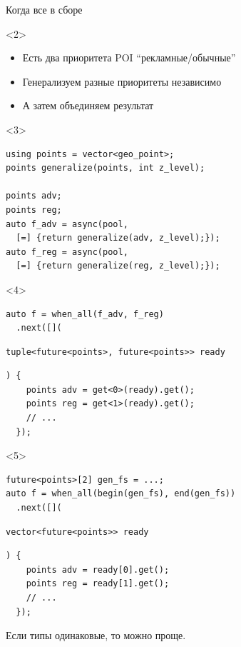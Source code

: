 \documentclass[aspectratio=169,hyperref={unicode},17pt]{beamer}
\begin{document}
\begin{frame}[fragile,t]{Когда все в сборе}
\begin{onlyenv}<2>
\begin{itemize}
 \item Есть два приоритета POI ``рекламные/обычные''
 \item Генерализуем разные приоритеты независимо
 \item А затем объединяем результат
\end{itemize}
\end{onlyenv}
\begin{onlyenv}<3>
\begin{lstlisting}[style=cppcode]
using points = vector<geo_point>;
points generalize(points, int z_level);

points adv;
points reg;
auto f_adv = async(pool,
  [=] {return generalize(adv, z_level);});
auto f_reg = async(pool,
  [=] {return generalize(reg, z_level);});
\end{lstlisting}
\end{onlyenv}
\begin{onlyenv}<4>
\begin{lstlisting}[style=cppcode,aboveskip=0pt,belowskip=0pt]
auto f = when_all(f_adv, f_reg)
  .next([](
\end{lstlisting}
\begin{lstlisting}[style=cppcode,backgroundcolor=\color{gray!30},aboveskip=0pt,belowskip=0pt]
    tuple<future<points>, future<points>> ready
\end{lstlisting}
\begin{lstlisting}[style=cppcode,aboveskip=0pt,belowskip=0pt]
  ) {
    points adv = get<0>(ready).get();
    points reg = get<1>(ready).get();
    // ...
  });
\end{lstlisting}
\end{onlyenv}
\begin{onlyenv}<5>
\begin{lstlisting}[style=cppcode,aboveskip=0pt,belowskip=0pt]
future<points>[2] gen_fs = ...;
auto f = when_all(begin(gen_fs), end(gen_fs))
  .next([](
\end{lstlisting}
\begin{lstlisting}[style=cppcode,backgroundcolor=\color{gray!30},aboveskip=0pt,belowskip=0pt]
    vector<future<points>> ready
\end{lstlisting}
\begin{lstlisting}[style=cppcode,aboveskip=0pt,belowskip=0pt]
  ) {
    points adv = ready[0].get();
    points reg = ready[1].get();
    // ...
  });
\end{lstlisting}
Если типы одинаковые, то можно проще.
\end{onlyenv}
\end{frame}
\end{document}
